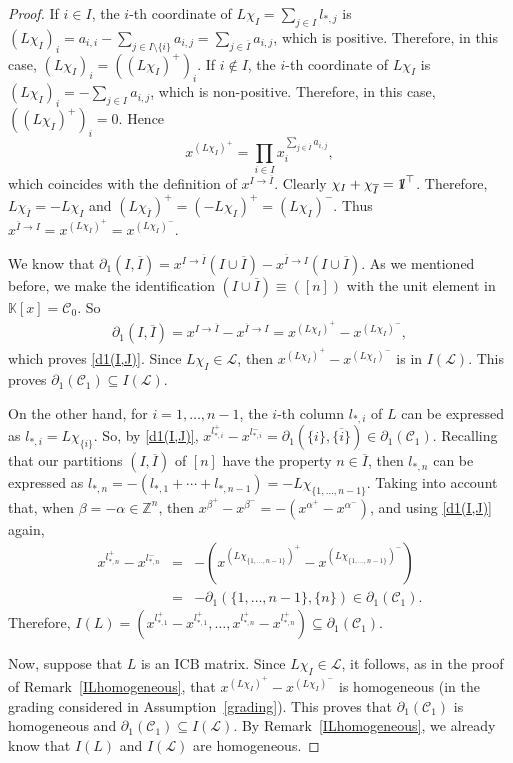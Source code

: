 \documentclass[10pt]{amsart}
\newcommand{\mbz}{\mbox{$\mathbb{Z}$}}
\newcommand{\mbk}{\mbox{$\mathbb{K}$}}
\newcommand{\mbone}{\mbox{$1\mkern-4.6mu {\rm l}$}}
\newcommand{\mcc}{\mbox{$\mathcal{C}$}}
\newcommand{\mcl}{\mbox{$\mathcal{L}$}}
\newcommand{\icb}{\mbox{$\mathrm{ICB}$}}
\newcommand{\dif}{\mbox{$\partial$}}
\theoremstyle{definition}
\theoremstyle{remark}
\begin{document}
\begin{proof}
If $i\in I$, the $i$-th coordinate of $L\chi_I=\sum_{j\in I}l_{*,j}$
is $(L\chi_I)_i=a_{i,i}-\sum_{j\in
  I\setminus\{i\}}a_{i,j}=\sum_{j\in\overline{I}}a_{i,j}$, which is
positive. Therefore, in this case, $(L\chi_I)_i=((L\chi_I)^+)_i$.  If
$i\not\in I$, the $i$-th coordinate of $L\chi_I$ is
$(L\chi_I)_i=-\sum_{j\in I}a_{i,j}$, which is non-positive. Therefore,
in this case, $((L\chi_I)^+)_i=0$. Hence
\[
x^{(L\chi_I)^{+}}=\prod_{i\in
  I}x_i^{\sum_{j\in\overline{I}}a_{i,j}},
\]
which coincides with the
definition of $x^{I\to\overline{I}}$. Clearly
$\chi_I+\chi_{\overline{I}}=\mbone^{\top}$. Therefore,
$L\chi_{\overline{I}}=-L\chi_I$ and
$(L\chi_{\overline{I}})^+=(-L\chi_I)^+=(L\chi_I)^-$. Thus
$x^{\overline{I}\to I}=x^{(L\chi_{\overline{I}})^+}=x^{(L\chi_I)^-}$.

We know that $\dif_1(I,\overline{I})=x^{I\to \overline{I}}(I\cup
\overline{I})-x^{\overline{I}\to I}(I\cup \overline{I})$. As we
mentioned before, we make the identification $(I\cup
\overline{I})\equiv ([n])$ with the unit element in $\mbk[x]=\mcc_0$. So
\begin{eqnarray*}
\dif_1(I,\overline{I})=x^{I\to \overline{I}}-x^{\overline{I}\to
  I}=x^{(L\chi_I)^+}-x^{(L\chi_I)^-}, 
\end{eqnarray*}
which proves \eqref{d1(I,J)}. Since $L\chi_I\in\mcl$, then
$x^{(L\chi_I)^+}-x^{(L\chi_I)^-}$ is in $I(\mcl)$. This proves
$\dif_1(\mcc_1)\subseteq I(\mcl)$.

On the other hand, for $i=1,\ldots, n-1$, the $i$-th column $l_{*,i}$
of $L$ can be expressed as $l_{*,i}=L\chi_{\{i\}}$.  So, by
\eqref{d1(I,J)},
$x^{l_{*,i}^+}-x^{l_{*,i}^-}=\dif_1(\{i\},\overline{\{i\}})\in
\dif_1(\mcc_1)$.  Recalling that our partitions $(I,\overline{I})$ of
$[n]$ have the property $n\in \overline{I}$, then $l_{*,n}$ can be
expressed as $l_{*,n}=-(l_{*,1}+\cdots +l_{*,n-1})=-L\chi_{\{1,\ldots
  ,n-1\}}$. Taking into account that, when $\beta=-\alpha\in\mbz^n$,
then $x^{\beta^+}-x^{\beta^-}=-(x^{\alpha^+}-x^{\alpha^-})$, and using
\eqref{d1(I,J)} again,
\begin{eqnarray*}
x^{l_{*,n}^+}-x^{l_{*,n}^-} & = &
  -(x^{(L\chi_{\{1,\ldots,n-1\}})^+}-x^{(L\chi_{\{1,\ldots
      ,n-1\}})^-})\\ &=& -\dif_1(\{1,\ldots ,n-1\},\{n\})\in
  \dif_1(\mcc_1).
\end{eqnarray*}
Therefore, $I(L)=(x^{l_{*,1}^+}-x^{l_{*,1}^+},\ldots
,x^{l_{*,n}^+}-x^{l_{*,n}^+})\subseteq \dif_1(\mcc_1)$.

Now, suppose that $L$ is an $\icb$ matrix. Since $L\chi_I\in\mcl$, it
follows, as in the proof of Remark~\ref{ILhomogeneous}, that
$x^{(L\chi_I)^+}-x^{(L\chi_I)^-}$ is homogeneous (in the grading
considered in Assumption~\ref{grading}). This proves that
$\dif_1(\mcc_1)$ is homogeneous and $\dif_1(\mcc_1)\subseteq
I(\mcl)$. By Remark~\ref{ILhomogeneous}, we already know that $I(L)$
and $I(\mcl)$ are homogeneous.
\end{proof}
\end{document}
